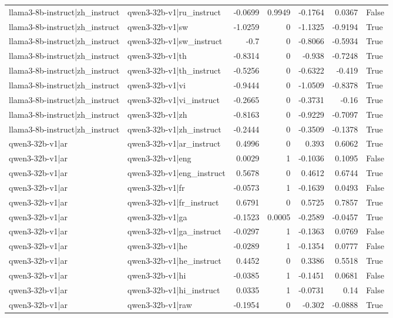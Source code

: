\begin{table}
\begin{tabular}{l l r r r r l}
llama3-8b-instruct|zh_instruct & qwen3-32b-v1|ru_instruct & -0.0699 & 0.9949 & -0.1764 & 0.0367 & False \\
llama3-8b-instruct|zh_instruct & qwen3-32b-v1|sw & -1.0259 & 0 & -1.1325 & -0.9194 & True \\
llama3-8b-instruct|zh_instruct & qwen3-32b-v1|sw_instruct & -0.7 & 0 & -0.8066 & -0.5934 & True \\
llama3-8b-instruct|zh_instruct & qwen3-32b-v1|th & -0.8314 & 0 & -0.938 & -0.7248 & True \\
llama3-8b-instruct|zh_instruct & qwen3-32b-v1|th_instruct & -0.5256 & 0 & -0.6322 & -0.419 & True \\
llama3-8b-instruct|zh_instruct & qwen3-32b-v1|vi & -0.9444 & 0 & -1.0509 & -0.8378 & True \\
llama3-8b-instruct|zh_instruct & qwen3-32b-v1|vi_instruct & -0.2665 & 0 & -0.3731 & -0.16 & True \\
llama3-8b-instruct|zh_instruct & qwen3-32b-v1|zh & -0.8163 & 0 & -0.9229 & -0.7097 & True \\
llama3-8b-instruct|zh_instruct & qwen3-32b-v1|zh_instruct & -0.2444 & 0 & -0.3509 & -0.1378 & True \\
qwen3-32b-v1|ar & qwen3-32b-v1|ar_instruct & 0.4996 & 0 & 0.393 & 0.6062 & True \\
qwen3-32b-v1|ar & qwen3-32b-v1|eng & 0.0029 & 1 & -0.1036 & 0.1095 & False \\
qwen3-32b-v1|ar & qwen3-32b-v1|eng_instruct & 0.5678 & 0 & 0.4612 & 0.6744 & True \\
qwen3-32b-v1|ar & qwen3-32b-v1|fr & -0.0573 & 1 & -0.1639 & 0.0493 & False \\
qwen3-32b-v1|ar & qwen3-32b-v1|fr_instruct & 0.6791 & 0 & 0.5725 & 0.7857 & True \\
qwen3-32b-v1|ar & qwen3-32b-v1|ga & -0.1523 & 0.0005 & -0.2589 & -0.0457 & True \\
qwen3-32b-v1|ar & qwen3-32b-v1|ga_instruct & -0.0297 & 1 & -0.1363 & 0.0769 & False \\
qwen3-32b-v1|ar & qwen3-32b-v1|he & -0.0289 & 1 & -0.1354 & 0.0777 & False \\
qwen3-32b-v1|ar & qwen3-32b-v1|he_instruct & 0.4452 & 0 & 0.3386 & 0.5518 & True \\
qwen3-32b-v1|ar & qwen3-32b-v1|hi & -0.0385 & 1 & -0.1451 & 0.0681 & False \\
qwen3-32b-v1|ar & qwen3-32b-v1|hi_instruct & 0.0335 & 1 & -0.0731 & 0.14 & False \\
qwen3-32b-v1|ar & qwen3-32b-v1|raw & -0.1954 & 0 & -0.302 & -0.0888 & True \\

\end{tabular}
\end{table}
